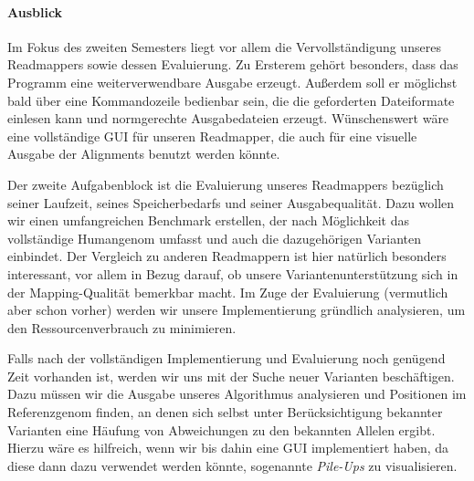 \paragraph{Ausblick}

Im Fokus des zweiten Semesters liegt vor allem die Vervollständigung unseres Readmappers sowie dessen Evaluierung. Zu Ersterem gehört besonders, dass das Programm eine weiterverwendbare Ausgabe erzeugt. Außerdem soll er möglichst bald über eine Kommandozeile bedienbar sein, die die geforderten Dateiformate einlesen kann und normgerechte Ausgabedateien erzeugt. Wünschenswert wäre eine vollständige GUI für unseren Readmapper, die auch für eine visuelle Ausgabe der Alignments benutzt werden könnte.

Der zweite Aufgabenblock ist die Evaluierung unseres Readmappers bezüglich seiner Laufzeit, seines Speicherbedarfs und seiner Ausgabequalität. Dazu wollen wir einen umfangreichen Benchmark erstellen, der nach Möglichkeit das vollständige Humangenom umfasst und auch die dazugehörigen Varianten einbindet. Der Vergleich zu anderen Readmappern ist hier natürlich besonders interessant, vor allem in Bezug darauf, ob unsere Variantenunterstützung sich in der Mapping-Qualität bemerkbar macht. Im Zuge der Evaluierung (vermutlich aber schon vorher) werden wir unsere Implementierung gründlich analysieren, um den Ressourcenverbrauch zu minimieren.

Falls nach der vollständigen Implementierung und Evaluierung noch genügend Zeit vorhanden ist, werden wir uns mit der Suche neuer Varianten beschäftigen. Dazu müssen wir die Ausgabe unseres Algorithmus analysieren und Positionen im Referenzgenom finden, an denen sich selbst unter Berücksichtigung bekannter Varianten eine Häufung von Abweichungen zu den bekannten Allelen ergibt. Hierzu wäre es hilfreich, wenn wir bis dahin eine GUI implementiert haben, da diese dann dazu verwendet werden könnte, sogenannte \textit{Pile-Ups} zu visualisieren.
